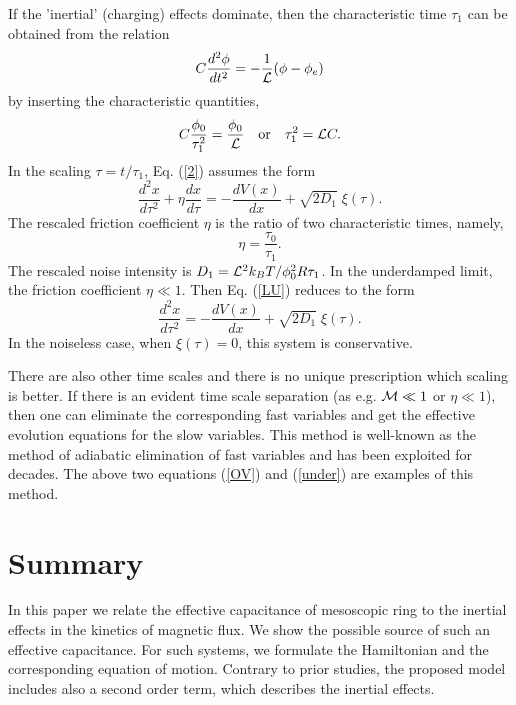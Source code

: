 \documentclass[a4paper,final]{appolb}
\begin{document}
If the 'inertial' (charging) effects  dominate, then the characteristic time $\tau_1$ 
can be obtained from the relation  
%
\begin{equation}\label{under1}
C\frac{d^2\phi}{dt^2} = -\frac{1}{{\cal L}}(\phi-\phi_{e}) 
\end{equation}
%
%
by inserting the characteristic quantities,  
%
\begin{equation}\label{under2}
C\frac{\phi_0}{\tau_1^2} = \frac{\phi_0}{{\cal L}} 
\quad \mbox{or} \quad \tau_1^2 = {\cal L} C. 
\end{equation}
%
In the scaling $\tau=t/\tau_1$, Eq. (\ref{2}) assumes the form 
%
\begin{equation}\label{LU}
\frac{d^2 x}{d\tau^2}+ \eta \frac{dx}{d\tau}
=-\frac{dV(x)}{dx}+\sqrt{2D_1}\;\xi(\tau).
\end{equation}
%
The rescaled friction coefficient $\eta$ is the ratio of two characteristic times, namely, 
%
\begin{equation}\label{eta}
\eta = \frac{\tau_0}{\tau_1}.
\end{equation}
%
The rescaled noise intensity is  $D_1={\cal L}^2 k_BT/\phi_0^2R\tau_1$. 
%
In the  underdamped limit, the friction coefficient 
 $\eta \ll 1$. 
Then  Eq. (\ref{LU}) reduces to the form 
%
%
\begin{equation}\label{under}
\frac{d^2 x}{d\tau^2}
=-\frac{dV(x)}{dx}+\sqrt{2D_1}\;\xi(\tau).
\end{equation}
%
In the noiseless case, when $\xi(\tau)=0$, this system is conservative. 

There are also other time scales and there is no unique 
prescription which scaling is better. 
If there is an evident time scale separation (as e.g. 
${\cal M} \ll 1$ or $\eta  \ll 1$), then one can eliminate the corresponding 
fast variables and  get the effective evolution equations for the slow variables. This 
method is well-known as the method of adiabatic elimination of fast variables and 
has been exploited for decades. The above two equations (\ref{OV}) and (\ref{under}) 
are examples of this method. 


\section{Summary}

In this paper we relate the effective capacitance of mesoscopic ring to the 
inertial effects in the kinetics of magnetic flux. We show the possible source of
such an effective capacitance.
For such systems, we formulate the Hamiltonian and the corresponding equation of motion.
Contrary to  prior studies, the proposed model includes also a second order term,
which describes the inertial effects.
\end{document}

